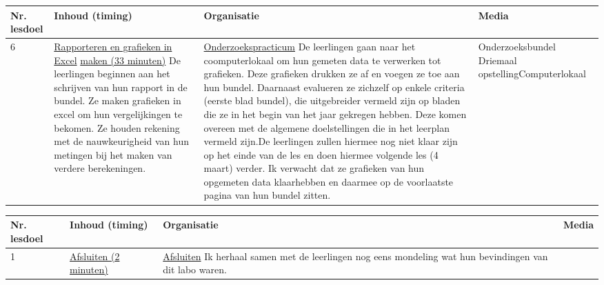 \begin{landscape}
\begin{tabularx}{1.56\textwidth}{|p{1.5cm}|p{7cm}|X|p{5cm}|}
	\hline
	\textbf{Nr. lesdoel } & \textbf{Inhoud (timing)}  & \textbf{Organisatie } & \textbf{Media } \\ \hline
	 6\newline\newline 7\newline\newline 8\newline\newline 9&\underline{Rapporteren en grafieken in Excel} \underline{maken (33 minuten)}\newline
	De leerlingen beginnen aan het schrijven van hun rapport in de bundel. Ze maken grafieken in excel om hun vergelijkingen te bekomen. Ze houden rekening met de nauwkeurigheid van hun metingen bij het maken van verdere berekeningen.
	&  \underline{Onderzoekspracticum}\newline 
	De leerlingen gaan naar het coomputerlokaal om hun gemeten data te verwerken tot grafieken. Deze grafieken drukken ze af en voegen ze toe aan hun bundel. Daarnaast evalueren ze zichzelf op enkele criteria (eerste blad bundel), die uitgebreider vermeld zijn op bladen die ze in het begin van het jaar gekregen hebben. Deze komen overeen met de algemene doelstellingen die in het leerplan vermeld zijn.\newline\newline De leerlingen zullen hiermee nog niet klaar zijn op het einde van de les en doen hiermee volgende les (4 maart) verder. Ik verwacht dat ze grafieken van hun opgemeten data klaarhebben en daarmee op de voorlaatste pagina van hun bundel zitten.
	& Onderzoeksbundel \newline\newline Driemaal opstelling\newline\newline Computerlokaal
	\\ \hline
\end{tabularx}
%	
\newline
\newline

\begin{tabularx}{1.56\textwidth}{|p{1.5cm}|p{7cm}|X|p{5cm}|}
	\hline
	\textbf{Nr. lesdoel } & \textbf{Inhoud (timing)}  & \textbf{Organisatie } & \textbf{Media } \\ \hline
	1\newline\newline 6&\underline{Afsluiten (2 minuten)}\newline 
	&  \underline{Afsluiten}\newline
	Ik herhaal samen met de leerlingen nog eens mondeling wat hun bevindingen van dit labo waren.
	& 
	\\ \hline
\end{tabularx}
	
%	
	
	
\end{landscape}


